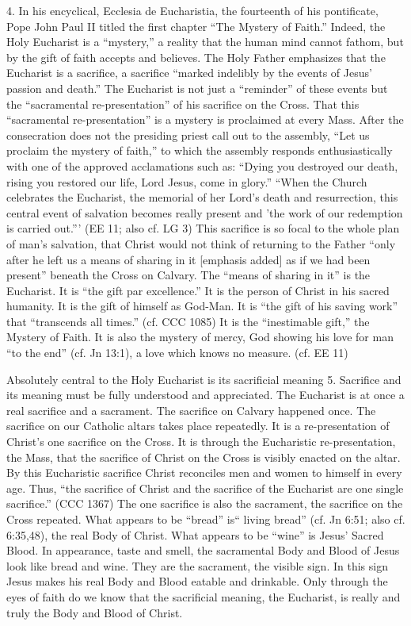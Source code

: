 \documentclass[oneside]{book}
\begin{document}
4. In his encyclical, Ecclesia de Eucharistia, the fourteenth of his
pontificate, Pope John Paul II titled the first chapter ``The Mystery of
Faith.'' Indeed, the Holy Eucharist is a ``mystery,'' a reality that the human
mind cannot fathom, but by the gift of faith accepts and believes. The Holy
Father emphasizes that the Eucharist is a sacrifice, a sacrifice ``marked
indelibly by the events of Jesus' passion and death.'' The Eucharist is not just
a ``reminder'' of these events but the ``sacramental re-presentation'' of his
sacrifice on the Cross. That this ``sacramental re-presentation'' is a mystery
is proclaimed at every Mass. After the consecration does not the presiding
priest call out to the assembly, ``Let us proclaim the mystery of faith,'' to
which the assembly responds enthusiastically with one of the approved
acclamations such as: ``Dying you destroyed our death, rising you restored our
life, Lord Jesus, come in glory.''
``When the Church celebrates the Eucharist, the memorial of her Lord's death and
resurrection, this central event of salvation becomes really present and 'the
work of our redemption is carried out.''' (EE 11; also cf. LG 3) This sacrifice
is so focal to the whole plan of man's salvation, that Christ would not think of
returning to the Father ``only after he left us a means of sharing in it
[emphasis added] as if we had been present'' beneath the Cross on Calvary. The
``means of sharing in it'' is the Eucharist. It is ``the gift par excellence.''
It is the person of Christ in his sacred humanity. It is the gift of himself as
God-Man. It is ``the gift of his saving work'' that ``transcends all times.''
(cf. CCC 1085) It is the ``inestimable gift,'' the Mystery of Faith. It is also
the mystery of mercy, God showing his love for man ``to the end'' (cf. Jn 13:1),
a love which knows no measure. (cf. EE 11)

Absolutely central to the Holy Eucharist is its sacrificial meaning
5. Sacrifice and its meaning must be fully understood and appreciated. The
Eucharist is at once a real sacrifice and a sacrament. The sacrifice on Calvary
happened once. The sacrifice on our Catholic altars takes place repeatedly. It
is a re-presentation of Christ's one sacrifice on the Cross. It is through the
Eucharistic re-presentation, the Mass, that the sacrifice of Christ on the Cross
is visibly enacted on the altar. By this Eucharistic sacrifice Christ reconciles
men and women to himself in every age. Thus, ``the sacrifice of Christ and the
sacrifice of the Eucharist are one single sacrifice.'' (CCC 1367)
The one sacrifice is also the sacrament, the sacrifice on the Cross
repeated. What appears to be ``bread'' is`` living bread'' (cf. Jn 6:51; also
cf. 6:35,48), the real Body of Christ. What appears to be ``wine'' is Jesus'
Sacred Blood. In appearance, taste and smell, the sacramental Body and Blood of
Jesus look like bread and wine. They are the sacrament, the visible sign. In
this sign Jesus makes his real Body and Blood eatable and drinkable. Only
through the eyes of faith do we know that the sacrificial meaning, the
Eucharist, is really and truly the Body and Blood of Christ.
\end{document}

